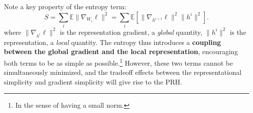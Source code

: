 \documentclass[11pt]{article}
\theoremstyle{plain}
\newcommand{\E}{\mathbb{E}}
\begin{document}
Note a key property of the entropy term:
\begin{equation}
    S = \sum_i \E\|\nabla_{W_i} \ell \|^2 =  \sum_i \E [ {\|\nabla_{h^{i+1}} \ell \|^2} {\|h^i\|^2} ].
\end{equation}
where ${\|\nabla_{h^i} \ell \|^2}$ is the representation gradient, a \textit{global} quantity, $\|h^i\|^2$ is the representation, a \textit{local} quantity. The entropy thus introduces a \textbf{coupling between the global gradient and the local representation}, encouraging both terms to be as simple as possible.\footnote{In the sense of having a small norm.} However, these two terms cannot be simultaneously minimized, and the tradeoff effects between the representational simplicity and gradient simplicity will give rise to the PRH.
\end{document}
